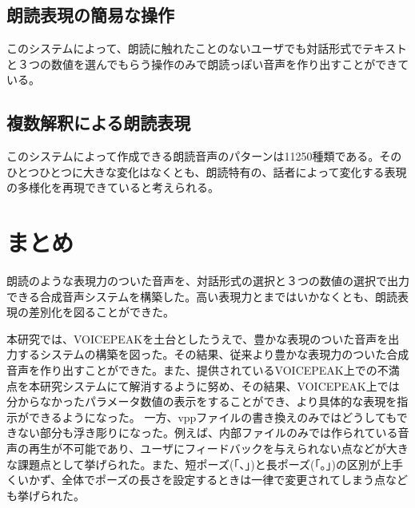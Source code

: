 \subsection{朗読表現の簡易な操作}%
このシステムによって、朗読に触れたことのないユーザでも対話形式でテキストと３つの数値を選んでもらう操作のみで朗読っぽい音声を作り出すことができている。
\subsection{複数解釈による朗読表現}%
このシステムによって作成できる朗読音声のパターンは11250種類である。そのひとつひとつに大きな変化はなくとも、朗読特有の、話者によって変化する表現の多様化を再現できていると考えられる。
\section{まとめ}朗読のような表現力のついた音声を、対話形式の選択と３つの数値の選択で出力できる合成音声システムを構築した。高い表現力とまではいかなくとも、朗読表現の差別化を図ることができた。

本研究では、VOICEPEAKを土台としたうえで、豊かな表現のついた音声を出力するシステムの構築を図った。その結果、従来より豊かな表現力のついた合成音声を作り出すことができた。また、提供されているVOICEPEAK上での不満点を本研究システムにて解消するように努め、その結果、VOICEPEAK上では分からなかったパラメータ数値の表示をすることができ、より具体的な表現を指示ができるようになった。
一方、vppファイルの書き換えのみではどうしてもできない部分も浮き彫りになった。例えば、内部ファイルのみでは作られている音声の再生が不可能であり、ユーザにフィードバックを与えられない点などが大きな課題点として挙げられた。また、短ポーズ(「、」)と長ポーズ(「。」)の区別が上手くいかず、全体でポーズの長さを設定するときは一律で変更されてしまう点なども挙げられた。




